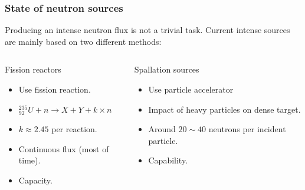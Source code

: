 \begin{frame}[t]
  \frametitle{State of neutron sources}
  Producing an intense neutron flux is not a trivial task.
  Current intense sources are mainly based on two different methods:
  \begin{columns}[T]
    \begin{column}{0.45\textwidth}
      \begin{block}{Fission reactors}
        \begin{itemize}
          \item Use fission reaction.
          \item $_{92}^{235}U + n \rightarrow X + Y + k \times n$
          \item $k\approx2.45$ per reaction.
          \item Continuous flux (most of time).
          \item Capacity.
        \end{itemize}
      \end{block}
      \vfill
    \end{column}
    \begin{column}{0.45\textwidth}
      \begin{block}{Spallation sources}
        \begin{itemize}
          \item Use particle accelerator
          \item Impact of heavy particles on dense target.
          \item Around $20 \sim 40$ neutrons per incident particle.
          \item Capability.
        \end{itemize}
      \end{block}
      \vfill
    \end{column}
  \end{columns}

\end{frame}

